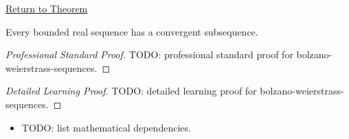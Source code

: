 \newpage
{}
\label{prf:bolzano-weierstrass-sequences}

\begin{remark*}[Return]
\hyperref[thm:bolzano-weierstrass-sequences]{Return to Theorem}
\end{remark*}

\begin{theorem*}
Every bounded real sequence has a convergent subsequence.

\smallskip
\noindent
\end{theorem*}

\begin{proof}[Professional Standard Proof]
\LRAProofBodyStart
TODO: professional standard proof for bolzano-weierstrass-sequences.
\end{proof}

\begin{proof}[Detailed Learning Proof]
\LRAProofBodyStart
TODO: detailed learning proof for bolzano-weierstrass-sequences.
\end{proof}

\begin{remark*}
\end{remark*}

\begin{dependencies}
\begin{itemize}
  \item TODO: list mathematical dependencies.
\end{itemize}
\end{dependencies}

\clearpage
